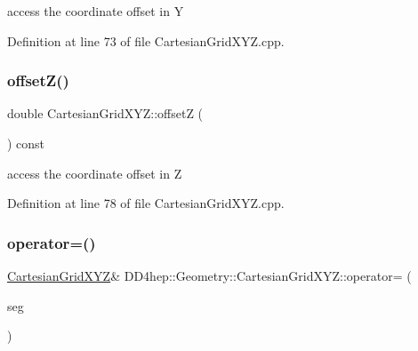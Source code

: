 access the coordinate offset in Y 



Definition at line 73 of file Cartesian\+Grid\+X\+Y\+Z.\+cpp.

\hypertarget{class_d_d4hep_1_1_geometry_1_1_cartesian_grid_x_y_z_a16de7326efae924cfb33d23e27154b5d}{}\label{class_d_d4hep_1_1_geometry_1_1_cartesian_grid_x_y_z_a16de7326efae924cfb33d23e27154b5d} 
\subsubsection{\texorpdfstring{offset\+Z()}{offsetZ()}}
{\footnotesize\ttfamily double Cartesian\+Grid\+X\+Y\+Z\+::offsetZ (\begin{DoxyParamCaption}{ }\end{DoxyParamCaption}) const}



access the coordinate offset in Z 



Definition at line 78 of file Cartesian\+Grid\+X\+Y\+Z.\+cpp.

\hypertarget{class_d_d4hep_1_1_geometry_1_1_cartesian_grid_x_y_z_a2d143d1936cd098233c1ec9b60e9786f}{}\label{class_d_d4hep_1_1_geometry_1_1_cartesian_grid_x_y_z_a2d143d1936cd098233c1ec9b60e9786f} 
\subsubsection{\texorpdfstring{operator=()}{operator=()}}
{\footnotesize\ttfamily \hyperlink{class_d_d4hep_1_1_geometry_1_1_cartesian_grid_x_y_z}{Cartesian\+Grid\+X\+YZ}\& D\+D4hep\+::\+Geometry\+::\+Cartesian\+Grid\+X\+Y\+Z\+::operator= (\begin{DoxyParamCaption}\item[{const \hyperlink{class_d_d4hep_1_1_geometry_1_1_cartesian_grid_x_y_z}{Cartesian\+Grid\+X\+YZ} \&}]{seg }\end{DoxyParamCaption})\hspace{0.3cm}{\ttfamily [default]}}



